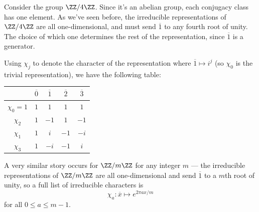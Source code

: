 
\begin{example}
Consider the group $\ZZ/4\ZZ$. Since it's an abelian group, each conjugacy class has one element. As we've seen before, the irreducible representations of $\ZZ/4\ZZ$ are all one-dimensional, and must send $\overline{1}$ to any fourth root of unity. The choice of which one determines the rest of the representation, since $\overline{1}$ is a generator. 

Using $\chi_j$ to denote the character of the representation where $\overline{1} \mapsto i^j$ (so $\chi_0$ is the trivial representation), we have the following table:




\begin{center}
    \begin{tabular}{c||c|c|c|c}
        & $\overline{0}$ & $\overline{1}$ & $\overline{2}$ & $\overline{3}$ \\
        \hline
        \hline
        $\chi_0 = 1$ & $1$ & $1$ & $1$ & $1$ \\
        \hline
        $\chi_2$  & $1$ & $-1$ & $1$ & $-1$ \\
        \hline
        $\chi_1$ & $1$ & $i$ & $-1$ & $-i$ \\
        \hline
        $\chi_3$ & $1$ & $-i$ & $-1$ & $i$
    \end{tabular}
\end{center}

A very similar story occurs for $\ZZ/m\ZZ$ for any integer $m$ --- the irreducible representations of $\ZZ/m\ZZ$ are all one-dimensional and send $\overline{1}$ to a $m$th root of unity, so a full list of irreducible characters is \[\chi_a : \overline{x} \mapsto e^{2\pi a x/m}\] for all $0 \leq a \leq m - 1$. 
\end{example}

